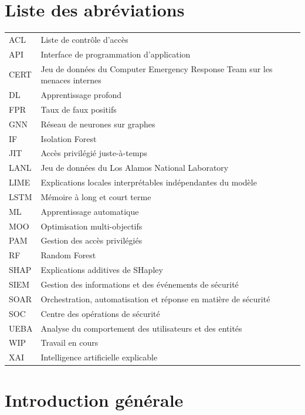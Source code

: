 \documentclass[11pt,a4paper,oneside]{report}
\theoremstyle{definition}
\theoremstyle{plain}
\begin{document}
\chapter*{Liste des abréviations}
\begin{longtable}{@{}ll@{}}
ACL & Liste de contrôle d'accès \\
API & Interface de programmation d'application \\
CERT & Jeu de données du Computer Emergency Response Team sur les menaces internes \\
DL & Apprentissage profond \\
FPR & Taux de faux positifs \\
GNN & Réseau de neurones sur graphes \\
IF & Isolation Forest \\
JIT & Accès privilégié juste-à-temps \\
LANL & Jeu de données du Los Alamos National Laboratory \\
LIME & Explications locales interprétables indépendantes du modèle \\
LSTM & Mémoire à long et court terme \\
ML & Apprentissage automatique \\
MOO & Optimisation multi-objectifs \\
PAM & Gestion des accès privilégiés \\
RF & Random Forest \\
SHAP & Explications additives de SHapley \\
SIEM & Gestion des informations et des événements de sécurité \\
SOAR & Orchestration, automatisation et réponse en matière de sécurité \\
SOC & Centre des opérations de sécurité \\
UEBA & Analyse du comportement des utilisateurs et des entités \\
WIP & Travail en cours \\
XAI & Intelligence artificielle explicable \\
\end{longtable}

\tableofcontents
\listoffigures
\listoftables
\clearpage
{}



\chapter{Introduction générale}
\label{chap:intro}
\end{document}
